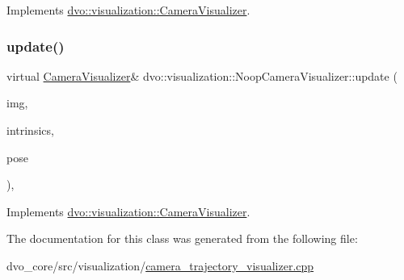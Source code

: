 Implements \mbox{\hyperlink{classdvo_1_1visualization_1_1_camera_visualizer_a646b21ea800d07f6a4174c80daf2bf50}{dvo\+::visualization\+::\+Camera\+Visualizer}}.

\mbox{\label{classdvo_1_1visualization_1_1_noop_camera_visualizer_a7983d8de9de45c5617c3e877d36d6ff3}} 
\subsubsection{\texorpdfstring{update()}{update()}}
{\footnotesize\ttfamily virtual \mbox{\hyperlink{classdvo_1_1visualization_1_1_camera_visualizer}{Camera\+Visualizer}}\& dvo\+::visualization\+::\+Noop\+Camera\+Visualizer\+::update (\begin{DoxyParamCaption}\item[{const \mbox{\hyperlink{structdvo_1_1core_1_1_rgbd_image}{dvo\+::core\+::\+Rgbd\+Image}} \&}]{img,  }\item[{const \mbox{\hyperlink{structdvo_1_1core_1_1_intrinsic_matrix}{dvo\+::core\+::\+Intrinsic\+Matrix}} \&}]{intrinsics,  }\item[{const Eigen\+::\+Affine3d \&}]{pose }\end{DoxyParamCaption})\hspace{0.3cm}{\ttfamily [inline]}, {\ttfamily [virtual]}}



Implements \mbox{\hyperlink{classdvo_1_1visualization_1_1_camera_visualizer_afd83119e63048b0229820045d54c95ec}{dvo\+::visualization\+::\+Camera\+Visualizer}}.



The documentation for this class was generated from the following file\+:\begin{DoxyCompactItemize}
\item 
dvo\+\_\+core/src/visualization/\mbox{\hyperlink{camera__trajectory__visualizer_8cpp}{camera\+\_\+trajectory\+\_\+visualizer.\+cpp}}\end{DoxyCompactItemize}
